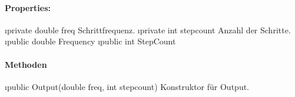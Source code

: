 \documentclass[../entwurf.tex]{subfiles}
\begin{document}
        \paragraph{Properties:}
        \begin{itemize}
            \i{private double freq} Schrittfrequenz.
            \i{private int stepcount} Anzahl der Schritte.
            \i{public double Frequency} 
            \i{public int StepCount} 
        \end{itemize}
        \paragraph{Methoden}
        \begin{itemize}
            \i{public Output(double freq, int stepcount)} Konstruktor für Output.
        \end{itemize}


                        
\end{document}
